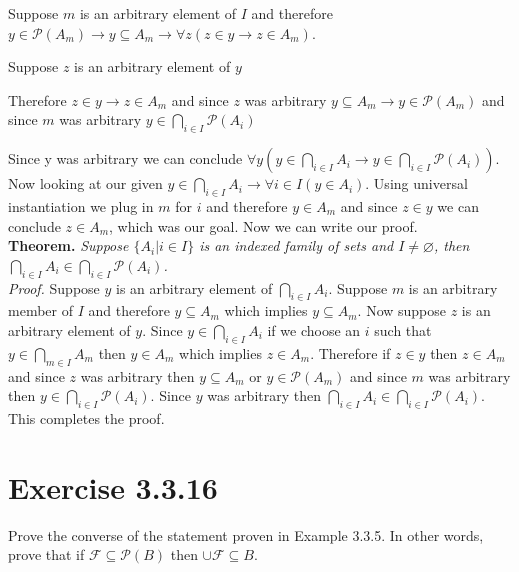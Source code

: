 \documentclass{article}
\newcommand{\n}{ \noindent }
\newcommand{\F}{\mathcal{F}}
\newcommand{\pwset}{\mathscr{P}}
\begin{document}
\begin{addmargin}[0.55cm]{0cm}
Suppose $m$ is an arbitrary element of $I$ and therefore $y \in \pwset(A_m) \rightarrow y \subseteq A_m \rightarrow \forall z (z \in y \rightarrow z \in A_m)$.
\end{addmargin}

\indent \indent Suppose $z$ is an arbitrary element of $y$ \\
\indent \indent \indent [proof of $z \in A_m$] 
\begin{addmargin}[0.55cm]{0cm}
Therefore $z \in y \rightarrow z \in A_m$ and since $z$ was arbitrary $y \subseteq A_m \rightarrow y \in \pwset(A_m)$ and since $m$ was arbitrary $y \in \bigcap_{i \in I} \pwset(A_i)$
\end{addmargin}
\n Since y was arbitrary we can conclude $\forall y (y \in \bigcap_{i \in I} A_i \rightarrow y \in \bigcap_{i \in I} \pwset(A_i))$. \\

\n Now looking at our given $y \in \bigcap_{i \in I} A_i \rightarrow \forall i \in I(y \in A_i)$. Using universal instantiation we plug in $m$ for $i$ and therefore $y \in A_m$ and since $z \in y$ we can conclude $z \in A_m$, which was our goal. Now we can write our proof. \\

\n \textbf{Theorem.} \textit{Suppose $ \{ A_i | i \in I \}$ is an indexed family of sets and $ I \neq \varnothing$, then $\bigcap_{i \in I} A_i \in \bigcap_{i \in I} \pwset(A_i)$.} \\
\n \textit{Proof.} Suppose $y$ is an arbitrary element of $\bigcap_{i \in I} A_i$. Suppose $m$ is an arbitrary member of $I$ and therefore $y \subseteq A_m$ which implies $y \subseteq A_m$. Now suppose $z$ is an arbitrary element of $y$. Since $y \in \bigcap_{i \in I} A_i$ if we choose an $i$ such that $y \in \bigcap_{m \in I} A_m$ then $y \in A_m$ which implies $z \in A_m$. Therefore if $z \in y$ then $z \in A_m$ and since $z$ was arbitrary then $y \subseteq A_m$ or $y \in \pwset(A_m)$ and since $m$ was arbitrary then $y \in \bigcap_{i \in I} \pwset(A_i)$. Since $y$ was arbitrary then $\bigcap_{i \in I} A_i \in \bigcap_{i \in I} \pwset(A_i)$. This completes the proof.

\section*{Exercise 3.3.16}
Prove the converse of the statement proven in Example 3.3.5. In other words, prove that if $\F \subseteq \pwset(B)$ then $\cup \F \subseteq B$. \\
\end{document}

